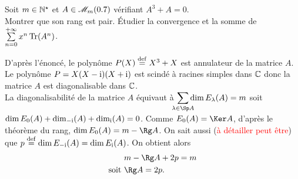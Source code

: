 \begin{exercice}
    Soit $m \in \mathbb{N}^\star$ et $A \in \mathscr{M}_m(0.7)$ vérifiant $A^3 + A = 0$.\\
    Montrer que son rang est pair. Étudier la convergence et la somme de $\sum\limits_{n=0}^{+\infty} x^n \Tr (A^n)$.
\end{exercice}

\begin{solution}
    D'après l'énoncé, le polynôme $P(X) \overset{\mathrm{\tiny def}}{=} X^3 + X$ est annulateur de la matrice $A$. Le polynôme $P = X(X-\mathrm{i})(X+\mathrm{i})$ est scindé à racines simples dans $\mathbb{C}$ donc la matrice $A$ est diagonalisable dans $\mathbb{C}$. \\
    La diagonalisabilité de la matrice $A$ équivaut à $\smashoperator{\sum\limits_{\lambda \in \Sp A}} \dim E_\lambda(A) = m$ soit $\dim E_0(A) + \dim_{-\mathrm{i}}(A) + \dim_{\mathrm{i}}(A) = 0$. Comme $E_0(A) = \Ker A$, d'après le théorème du rang, $\dim E_0(A) = m - \Rg A$. On sait aussi (\textcolor{red}{à détailler peut être}) que $p \overset{\mathrm{\tiny def}}{=} \dim E_{-\mathrm{i}}(A) = \dim E_{\mathrm{i}}(A)$. On obtient alors
    \begin{align*}
        & m - \Rg A + 2p = m \\
        \text{soit } & \Rg A = 2p.
    \end{align*}
\end{solution}